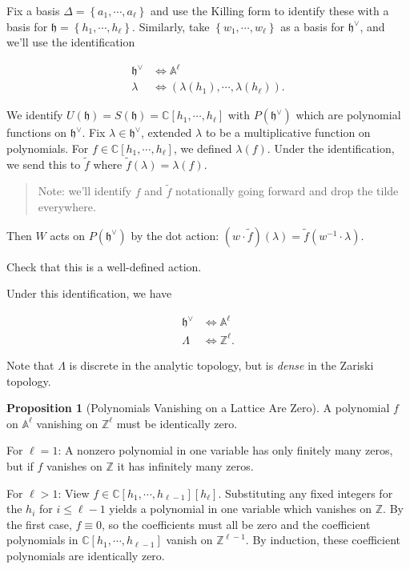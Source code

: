 \documentclass[11pt]{scrartcl}
\theoremstyle{definition}
\theoremstyle{theorem}
\newtheorem{proposition}[theorem]{Proposition}
\theoremstyle{proof}
\newenvironment{proof}
{\pushQED{$\qed$}\pf}
{\par\popQED\endpf}
\theoremstyle{definition}
\theoremstyle{break}
\theoremstyle{problem}
\providecommand{\tightlist}{%
  \setlength{\itemsep}{0pt}\setlength{\parskip}{0pt}}
\renewcommand{\AA}[0]{{\mathbb{A}}}
\newcommand{\CC}[0]{{\mathbb{C}}}
\newcommand{\ZZ}[0]{{\mathbb{Z}}}
\newcommand{\dual}[0]{^\vee}
\newcommand{\inv}[0]{^{-1}}
\newcommand{\lieh}[0]{{\mathfrak{h}}}
\newcommand{\theset}[1]{\left\{{#1}\right\}}
\renewcommand{\qed}[0]{\hfill\blacksquare}
\begin{document}
Fix a basis \(\Delta = \theset{a_1, \cdots, a_\ell}\) and use the
Killing form to identify these with a basis for
\(\lieh = \theset{h_1, \cdots, h_\ell}\). Similarly, take
\(\theset{w_1, \cdots, w_\ell}\) as a basis for \(\lieh\dual\), and
we'll use the identification

\begin{align*}
\lieh\dual &\iff \AA^\ell \\
\lambda &\iff (\lambda(h_1), \cdots, \lambda(h_\ell))
.\end{align*}

We identify \(U(\lieh) = S(\lieh) = \CC[h_1, \cdots, h_\ell]\) with
\(P(\lieh\dual)\) which are polynomial functions on \(\lieh\dual\). Fix
\(\lambda \in \lieh\dual\), extended \(\lambda\) to be a multiplicative
function on polynomials. For \(f\in \CC[h_1, \cdots, h_\ell]\), we
defined \(\lambda(f)\). Under the identification, we send this to
\(\tilde f\) where \(\tilde f(\lambda) = \lambda(f)\).

\begin{quote}
Note: we'll identify \(f\) and \(\tilde f\) notationally going forward
and drop the tilde everywhere.
\end{quote}

Then \(W\) acts on \(P(\lieh\dual)\) by the dot action:
\((w\cdot \tilde f)(\lambda) = \tilde f(w\inv \cdot \lambda)\).

\begin{description}
\tightlist
\item[Exercise]
Check that this is a well-defined action.
\end{description}

Under this identification, we have

\begin{align*}
\lieh\dual &\iff \AA^\ell \\
\Lambda &\iff \ZZ^\ell
.\end{align*}

Note that \(\Lambda\) is discrete in the analytic topology, but is
\emph{dense} in the Zariski topology.

\begin{proposition}[Polynomials Vanishing on a Lattice Are Zero]

A polynomial \(f\) on \(\AA^\ell\) vanishing on \(\ZZ^\ell\) must be
identically zero.\end{proposition}

\begin{proof}

For \(\ell = 1\): A nonzero polynomial in one variable has only finitely
many zeros, but if \(f\) vanishes on \(\ZZ\) it has infinitely many
zeros.

For \(\ell > 1\): View \(f\in \CC[h_1, \cdots, h_{\ell-1}][h_\ell]\).
Substituting any fixed integers for the \(h_i\) for \(i\leq \ell - 1\)
yields a polynomial in one variable which vanishes on \(\ZZ\). By the
first case, \(f \equiv 0\), so the coefficients must all be zero and the
coefficient polynomials in \(\CC[h_1, \cdots ,h_{\ell-1}]\) vanish on
\(\ZZ^{\ell-1}\). By induction, these coefficient polynomials are
identically zero.\end{proof}
\end{document}
